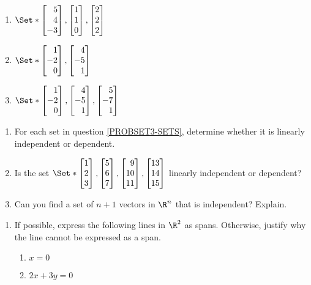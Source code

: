 \begin{exercises}
\begin{problist}
\begin{enumerate}
			\item $\Set*{\mat{5\\4\\-3},\mat{1\\1\\0},\mat{2\\2\\2}}$

			\item $\Set*{\mat{1\\-2\\0},\mat{4\\-5\\1}}$

			\item $\Set*{\mat{1\\-2\\0},\mat{4\\-5\\1},\mat{5\\-7\\1}}$
		\end{enumerate}

		\prob
		\begin{enumerate}
			\item For each set in question \ref{PROBSET3-SETS}, determine whether it is
				linearly independent or dependent.

			\item Is the set $\Set*{\mat{1\\2\\3},\mat{5\\6\\7},
				\mat{9\\10\\11}, \mat{13\\14\\15}}$ linearly
				independent or dependent?

			\item Can you find a set of $n+1$ vectors in $\R^{n}$ that is independent? Explain.
		\end{enumerate}

		\prob
		\begin{enumerate}
			\item If possible, express the following lines in $\R^{2}$
				as spans. Otherwise, justify why the line cannot
				be expressed as a span. \label{PROBSET3-R2-spans}
				\begin{enumerate}
					\item $x=0$

					\item $2x+3y=0$


\end{enumerate}
\end{enumerate}
\end{problist}
\end{exercises}
